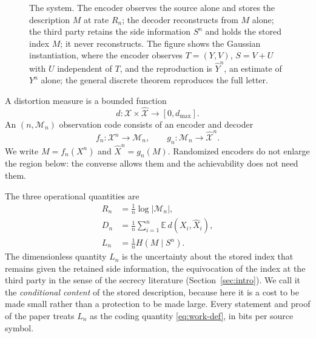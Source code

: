 \documentclass[11pt,onecolumn]{IEEEtran}
\newcommand{\E}{\mathbb{E}}
\newcommand{\cX}{\mathcal{X}}
\newcommand{\hX}{\widehat{X}}
\newcommand{\hXn}{\widehat{X}^{n}}
\newcommand{\hY}{\widehat{Y}}
\begin{document}
\begin{figure}[!t]
\centering
{}
\caption{The system. The encoder observes the source alone and stores
the description $M$ at rate $R_n$; the decoder reconstructs from $M$ alone;
the third party retains the side information $S^n$ and holds the stored
index $M$; it never reconstructs. The figure shows the Gaussian
instantiation, where the encoder observes $T=(Y,V)$, $S=V+U$ with $U$
independent of $T$, and
the reproduction is $\hY^n$, an estimate of $Y^n$ alone; the general
discrete theorem reproduces the full letter.}
\label{fig:system}
\end{figure}

A distortion measure is a bounded function
\begin{equation}
 d:\cX\times\widehat{\cX}\longrightarrow[0,d_{\max}].
\end{equation}
An $(n,\mathcal M_n)$ observation code consists of an encoder and decoder
\begin{equation}
 f_n:\cX^n\to\mathcal M_n,
 \qquad
 g_n:\mathcal M_n\to\widehat{\cX}^{n}.
\end{equation}
We write $M=f_n(X^n)$ and $\hXn=g_n(M)$. Randomized encoders do not enlarge
the region below: the converse allows them and the achievability does not
need them.

The three operational quantities are
\begin{align}
 R_n&=\frac{1}{n}\log |\mathcal M_n|,\label{eq:rate-def}\\
 D_n&=\frac{1}{n}\sum_{i=1}^{n}\E\,d(X_i,\hX_i),\label{eq:dist-def}\\
 L_n&=\frac{1}{n}H(M\mid S^n).\label{eq:work-def}
\end{align}
The dimensionless quantity $L_n$ is the uncertainty about the stored
index that remains given the retained side information, the equivocation
of the index at the third party in the sense of the secrecy literature
(Section~\ref{sec:intro}). We call it the \emph{conditional content} of the
stored description, because here it is a cost to be made small rather
than a protection to be made large. Every statement and proof of the
paper treats $L_n$ as the coding quantity \eqref{eq:work-def}, in bits per
source symbol.
\end{document}
